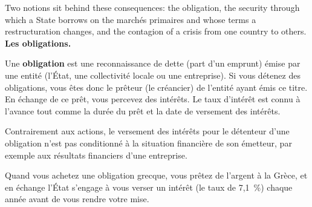 Two notions sit behind these consequences: the obligation, the security
through which a State borrows on the marchés primaires and whose terms a
restructuration changes, and the contagion of a crisis from one country to
others.\\

\textbf{Les obligations.}
\begin{definition}
  Une \textbf{obligation} est une reconnaissance de dette (part d'un emprunt)
  émise par une entité (l'État, une collectivité locale ou une entreprise). Si
  vous détenez des obligations, vous êtes donc le prêteur (le créancier) de
  l'entité ayant émis ce titre. En échange de ce prêt, vous percevez des
  intérêts. Le taux d'intérêt est connu à l'avance tout comme la durée du prêt
  et la date de versement des intérêts.
\end{definition}
Contrairement aux actions, le versement des intérêts pour le détenteur d'une
obligation n'est pas conditionné à la situation financière de son émetteur, par
exemple aux résultats financiers d'une entreprise.

\begin{example}
  Quand vous achetez une obligation grecque, vous prêtez de l'argent à la
  Grèce, et en échange l'État s'engage à vous verser un intérêt (le taux de
  7,1~\%) chaque année avant de vous rendre votre mise.
\end{example}

